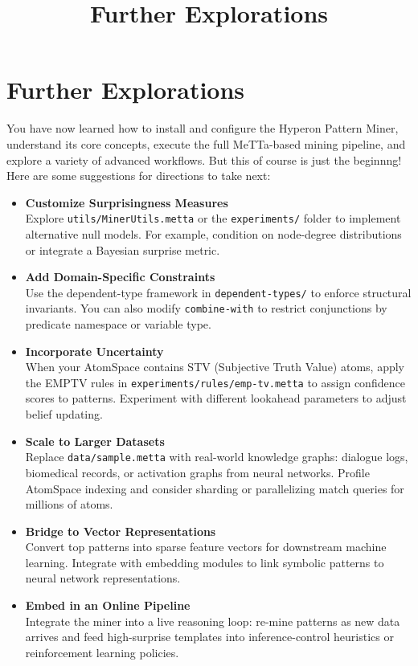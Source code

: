 \documentclass{article}
\title{Further Explorations}
\begin{document}
\section{Further Explorations}

You have now learned how to install and configure the Hyperon Pattern Miner, understand its core concepts, execute the full MeTTa-based mining pipeline, and explore a variety of advanced workflows.  But this of course is just the beginnng! Here are some suggestions for directions to take next:

\begin{itemize}
  \item \textbf{Customize Surprisingness Measures}\\
    Explore \texttt{utils/MinerUtils.metta} or the \texttt{experiments/} folder to implement alternative null models.  For example, condition on node-degree distributions or integrate a Bayesian surprise metric.

  \item \textbf{Add Domain-Specific Constraints}\\
    Use the dependent-type framework in \texttt{dependent-types/} to enforce structural invariants.  You can also modify \texttt{combine-with} to restrict conjunctions by predicate namespace or variable type.

  \item \textbf{Incorporate Uncertainty}\\
    When your AtomSpace contains STV (Subjective Truth Value) atoms, apply the EMPTV rules in \texttt{experiments/rules/emp-tv.metta} to assign confidence scores to patterns.  Experiment with different lookahead parameters to adjust belief updating.

  \item \textbf{Scale to Larger Datasets}\\
    Replace \texttt{data/sample.metta} with real-world knowledge graphs: dialogue logs, biomedical records, or activation graphs from neural networks.  Profile AtomSpace indexing and consider sharding or parallelizing match queries for millions of atoms.

  \item \textbf{Bridge to Vector Representations}\\
    Convert top patterns into sparse feature vectors for downstream machine learning.  Integrate with embedding modules to link symbolic patterns to neural network representations.

  \item \textbf{Embed in an Online Pipeline}\\
    Integrate the miner into a live reasoning loop: re-mine patterns as new data arrives and feed high-surprise templates into inference-control heuristics or reinforcement learning policies.


\end{itemize}
\end{document}
